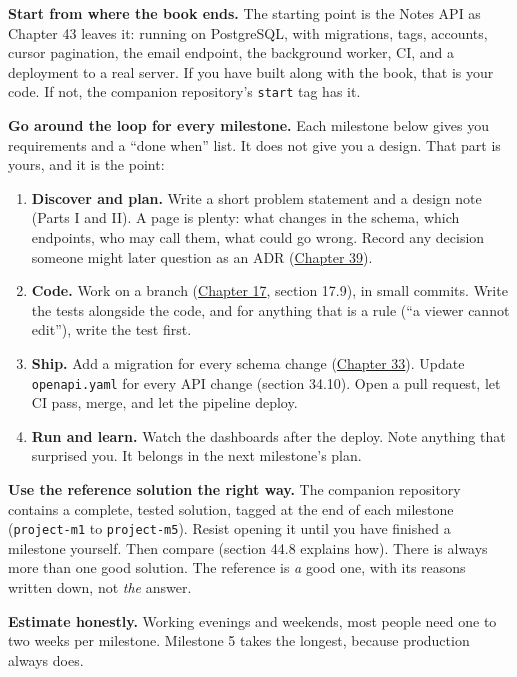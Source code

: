 \textbf{Start from where the book ends.} The starting point is the Notes API as Chapter 43 leaves it: running on PostgreSQL, with migrations, tags, accounts, cursor pagination, the email endpoint, the background worker, CI, and a deployment to a real server. If you have built along with the book, that is your code. If not, the companion repository's \texttt{start} tag has it.

\textbf{Go around the loop for every milestone.} Each milestone below gives you requirements and a ``done when'' list. It does not give you a design. That part is yours, and it is the point:

\begin{enumerate}
\def\labelenumi{\arabic{enumi}.}
\tightlist
\item
  \textbf{Discover and plan.} Write a short problem statement and a design note (Parts I and II). A page is plenty: what changes in the schema, which endpoints, who may call them, what could go wrong. Record any decision someone might later question as an ADR (\hyperref[ch:39-local-vs-production]{Chapter 39}).
\item
  \textbf{Code.} Work on a branch (\hyperref[ch:17-build-process]{Chapter 17}, section 17.9), in small commits. Write the tests alongside the code, and for anything that is a rule (``a viewer cannot edit''), write the test first.
\item
  \textbf{Ship.} Add a migration for every schema change (\hyperref[ch:33-logic-execution]{Chapter 33}). Update \texttt{openapi.yaml} for every API change (section 34.10). Open a pull request, let CI pass, merge, and let the pipeline deploy.
\item
  \textbf{Run and learn.} Watch the dashboards after the deploy. Note anything that surprised you. It belongs in the next milestone's plan.
\end{enumerate}

\noindent{}\textbf{Use the reference solution the right way.} The companion repository contains a complete, tested solution, tagged at the end of each milestone (\texttt{project-m1} to \texttt{project-m5}). Resist opening it until you have finished a milestone yourself. Then compare (section 44.8 explains how). There is always more than one good solution. The reference is \emph{a} good one, with its reasons written down, not \emph{the} answer.

\textbf{Estimate honestly.} Working evenings and weekends, most people need one to two weeks per milestone. Milestone 5 takes the longest, because production always does.

